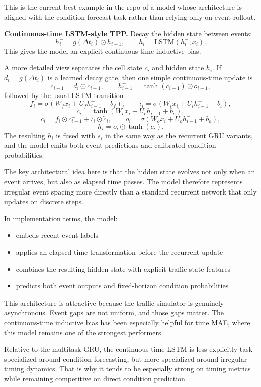 \documentclass[11pt]{article}
\begin{document}
This is the current best example in the repo of a model whose architecture is aligned with the condition-forecast task rather than relying only on event rollout.

\textbf{Continuous-time LSTM-style TPP.}
Decay the hidden state between events:
\[
h_i^- = g(\Delta t_i)\odot h_{i-1}, \qquad
h_i = \mathrm{LSTM}(h_i^-, x_i).
\]
This gives the model an explicit continuous-time inductive bias.

A more detailed view separates the cell state \(c_i\) and hidden state \(h_i\). If \(d_i = g(\Delta t_i)\) is a learned decay gate, then one simple continuous-time update is
\[
c_{i-1}^- = d_i \odot c_{i-1}, \qquad h_{i-1}^- = \tanh(c_{i-1}^-)\odot o_{i-1},
\]
followed by the usual LSTM transition
\[
f_i = \sigma(W_f x_i + U_f h_{i-1}^- + b_f), \qquad
\iota_i = \sigma(W_{\iota} x_i + U_{\iota} h_{i-1}^- + b_{\iota}),
\]
\[
\tilde{c}_i = \tanh(W_c x_i + U_c h_{i-1}^- + b_c),
\]
\[
c_i = f_i \odot c_{i-1}^- + \iota_i \odot \tilde{c}_i, \qquad
o_i = \sigma(W_o x_i + U_o h_{i-1}^- + b_o),
\]
\[
h_i = o_i \odot \tanh(c_i).
\]
The resulting \(h_i\) is fused with \(s_i\) in the same way as the recurrent GRU variants, and the model emits both event predictions and calibrated condition probabilities.

The key architectural idea here is that the hidden state evolves not only when an event arrives, but also as elapsed time passes. The model therefore represents irregular event spacing more directly than a standard recurrent network that only updates on discrete steps.

In implementation terms, the model:
\begin{itemize}
  \item embeds recent event labels
  \item applies an elapsed-time transformation before the recurrent update
  \item combines the resulting hidden state with explicit traffic-state features
  \item predicts both event outputs and fixed-horizon condition probabilities
\end{itemize}

This architecture is attractive because the traffic simulator is genuinely asynchronous. Event gaps are not uniform, and those gaps matter. The continuous-time inductive bias has been especially helpful for time MAE, where this model remains one of the strongest performers.

Relative to the multitask GRU, the continuous-time LSTM is less explicitly task-specialized around condition forecasting, but more specialized around irregular timing dynamics. That is why it tends to be especially strong on timing metrics while remaining competitive on direct condition prediction.
\end{document}
